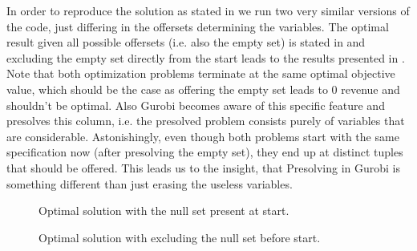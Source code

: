 In order to reproduce the solution as stated in \cite{Bront.2009} we run two very similar versions of the code, just differing in the offersets determining the variables. The optimal result given all possible offersets (i.e. also the empty set) is stated in  and excluding the empty set directly from the start leads to the results presented in . Note that both optimization problems terminate at the same optimal objective value, which should be the case as offering the empty set leads to $0$ revenue and shouldn't be optimal. Also Gurobi becomes aware of this specific feature and presolves this column, i.e. the presolved problem consists purely of variables that are considerable. Astonishingly, even though both problems start with the same specification now (after presolving the empty set), they end up at distinct tuples that should be offered. This leads us to the insight, that Presolving in Gurobi is something different than just erasing the useless variables. 

\begin{figure}
	\caption{Optimal solution with the null set present at start.\label{txt-CDLP-withNull}}
	
\end{figure}
\begin{figure}
	\caption{Optimal solution with excluding the null set before start.\label{txt-CDLP-withoutNull}}
	
\end{figure}